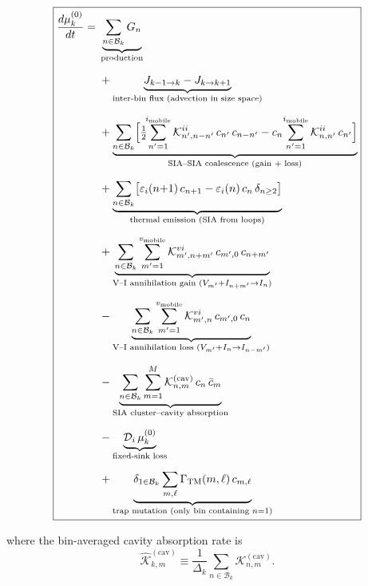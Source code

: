 \documentclass[pdflatex,sn-basic]{sn-jnl} %
\begin{document}
\clearpage
\begin{equation}\label{eq:mu0_eq}
\boxed{
\begin{split}
    \frac{d\mu_k^{(0)}}{dt} = {} &
    \underbrace{
        \sum_{n \in \mathcal{B}_k} G_n
    }_{\text{production}}
    \\[6pt]
    &+ \underbrace{
        J_{k-1 \to k} - J_{k \to k+1}
    }_{\text{inter-bin flux (advection in size space)}}
    \\[6pt]
    &+ \underbrace{
        \sum_{n \in \mathcal{B}_k}\Bigl[
        \tfrac{1}{2}\!\!\sum_{n'=1}^{i_{\rm mobile}}
        \mathcal{K}_{n',n-n'}^{ii}\,c_{n'}\,c_{n-n'}
        - c_n\!\sum_{n'=1}^{i_{\rm mobile}}\mathcal{K}_{n,n'}^{ii}\,c_{n'}
        \Bigr]
    }_{\text{SIA--SIA coalescence (gain + loss)}}
    \\[6pt]
    &+ \underbrace{
        \sum_{n \in \mathcal{B}_k}\bigl[
        \varepsilon_i(n{+}1)\,c_{n+1} - \varepsilon_i(n)\,c_n\,\delta_{n\ge 2}
        \bigr]
    }_{\text{thermal emission (SIA from loops)}}
    \\[6pt]
    &+ \underbrace{
        \sum_{n \in \mathcal{B}_k}
        \sum_{m'=1}^{v_{\rm mobile}}
        \mathcal{K}_{m',n+m'}^{vi}\,c_{m',0}\,c_{n+m'}
    }_{\text{V--I annihilation gain } (V_{m'}+I_{n+m'}\to I_n)}
    \\[6pt]
    &- \underbrace{
        \sum_{n \in \mathcal{B}_k}
        \sum_{m'=1}^{v_{\rm mobile}}
        \mathcal{K}_{m',n}^{vi}\,c_{m',0}\,c_n
    }_{\text{V--I annihilation loss } (V_{m'}+I_n\to I_{n-m'})}
    \\[6pt]
    &- \underbrace{
        \sum_{n \in \mathcal{B}_k}\sum_{m=1}^{M}
        \mathcal{K}_{n,m}^{(\mathrm{cav})}\,c_n\,\bar{c}_m
    }_{\text{SIA cluster--cavity absorption}}
    \\[6pt]
    &- \underbrace{
        \mathcal{D}_i\,\mu_k^{(0)}
    }_{\text{fixed-sink loss}}
    \\[6pt]
    &+ \underbrace{
        \delta_{1 \in \mathcal{B}_k}\sum_{m,\ell}
        \Gamma_{\mathrm{TM}}(m,\ell)\,c_{m,\ell}
    }_{\text{trap mutation (only bin containing }n{=}1\text{)}}
\end{split}
}
\end{equation}

\noindent
where the bin-averaged cavity absorption rate is
\begin{equation}\label{eq:Khat}
    \hat{\mathcal{K}}_{k,m}^{(\mathrm{cav})}
    \equiv \frac{1}{\Delta_k}
    \sum_{n \in \mathcal{B}_k}
    \mathcal{K}_{n,m}^{(\mathrm{cav})}.
\end{equation}
\end{document}
